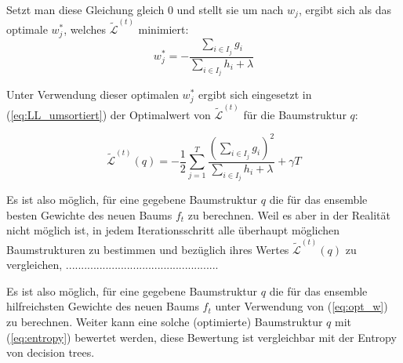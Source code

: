 \documentclass[a4paper,12pt]{scrartcl}
\newcommand{\LL}{\ensuremath{\mathcal{L}}}
\begin{document}
Setzt man diese Gleichung gleich $0$ und stellt sie um nach $w_j$, ergibt sich als das optimale $w^*_j$, welches $\tilde{\LL}^{(t)}$ minimiert:
\begin{equation}
	\label{eq:opt_w}
	w_j^* = - \frac{\sum_{i \in I_j} g_i}{\sum_{i \in I_j} h_i + \lambda}
\end{equation}

Unter Verwendung dieser optimalen $w_j^*$ ergibt sich eingesetzt in (\ref{eq:LL_umsortiert}) der Optimalwert von $\tilde{\LL}^{(t)}$ für die Baumstruktur $q$:

\begin{equation} \label{eq:entropy}
	\tilde{\LL}^{(t)} (q) = - \frac{1}{2} \sum_{j=1}^{T} \frac{(\sum_{i \in I_j} g_i)^2}{\sum_{i \in I_j} h_i + \lambda} + \gamma T
\end{equation}

Es ist also möglich, für eine gegebene Baumstruktur $q$ die für das ensemble besten Gewichte des neuen Baums $f_t$ zu berechnen. Weil es aber in der Realität nicht möglich ist, in jedem Iterationsschritt alle überhaupt möglichen Baumstrukturen zu bestimmen und bezüglich ihres Wertes $\tilde{\LL}^{(t)} (q)$ zu vergleichen, ..................................................


Es ist also möglich, für eine gegebene Baumstruktur $q$ die für das ensemble hilfreichsten Gewichte des neuen Baums $f_t$ unter Verwendung von (\ref{eq:opt_w}) zu berechnen. Weiter kann eine solche (optimierte) Baumstruktur $q$ mit (\ref{eq:entropy}) bewertet werden, diese Bewertung ist vergleichbar mit der Entropy von decision trees. 
\end{document}
